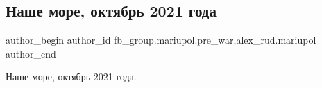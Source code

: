  
 
 
 
 

\subsection{Наше море, октябрь 2021 года}
\label{sec:11_02_2023.fb.fb_group.mariupol.pre_war.5.nashe_more__oktyabr_}
 
\ifcmt
 author_begin
   author_id fb_group.mariupol.pre_war,alex_rud.mariupol
 author_end
\fi

Наше море, октябрь 2021 года.

